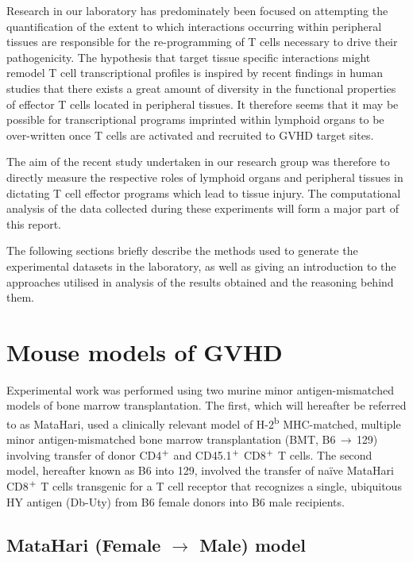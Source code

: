 Research in our laboratory has predominately been focused on attempting the quantification of the extent to which interactions occurring within peripheral tissues are responsible for the re-programming of T cells necessary to drive their pathogenicity. The hypothesis that target tissue specific interactions might remodel T cell transcriptional profiles is inspired by recent findings in human studies that there exists a great amount of diversity in the functional properties of effector T cells located in peripheral tissues. It therefore seems that it may be possible for transcriptional programs imprinted within lymphoid organs to be over-written once T cells are activated and recruited to GVHD target sites. 

The aim of the recent study undertaken in our research group was therefore to directly measure the respective roles of lymphoid organs and peripheral tissues in dictating T cell effector programs which lead to tissue injury. The computational analysis of the data collected during these experiments will form a major part of this report. 

The following sections briefly describe the methods used to generate the experimental datasets in the laboratory, as well as giving an introduction to the approaches utilised in analysis of the results obtained and the reasoning behind them. 

\section{Mouse models of GVHD}

Experimental work was performed using two murine minor antigen-mismatched models of bone marrow transplantation. The first, which will hereafter be referred to as MataHari, used a clinically relevant model of H-2\textsuperscript{b} MHC-matched, multiple minor antigen-mismatched bone marrow transplantation (BMT, B6$\,\to\,$129) involving transfer of donor CD4$\textsuperscript{+}$ and CD45.1$\textsuperscript{+}$ CD8$\textsuperscript{+}$ T cells. The second model, hereafter known as B6 into 129, involved the transfer of na\"ive MataHari CD8$\textsuperscript{+}$ T cells transgenic for a T cell receptor that recognizes a single, ubiquitous HY antigen (Db-Uty) from B6 female donors into B6 male recipients. 


\subsection{MataHari (Female $\to$ Male) model}

